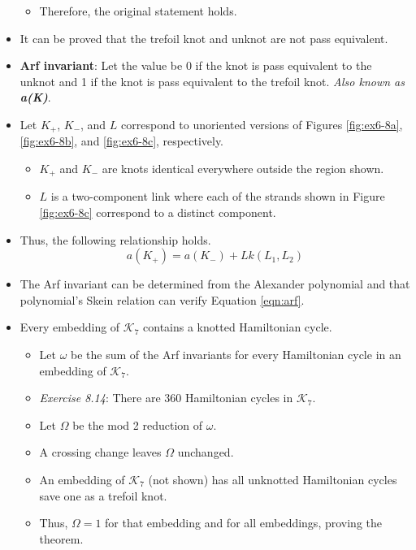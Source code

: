 \documentclass[titlepage]{article}
\numberwithin{figure}{section}
\numberwithin{table}{section}
\numberwithin{equation}{section}
\begin{document}
\begin{itemize}
\begin{itemize}
        \item Therefore, the original statement holds.
    \end{itemize}
    \item It can be proved that the trefoil knot and unknot are not pass equivalent.
    \item \textbf{Arf invariant}: Let the value be 0 if the knot is pass equivalent to the unknot and 1 if the knot is pass equivalent to the trefoil knot. \emph{Also known as} \emph{\textbf{a(K)}}.
    \item Let $K_+$, $K_-$, and $L$ correspond to unoriented versions of Figures \ref{fig:ex6-8a}, \ref{fig:ex6-8b}, and \ref{fig:ex6-8c}, respectively.
    \begin{itemize}
        \item $K_+$ and $K_-$ are knots identical everywhere outside the region shown.
        \item $L$ is a two-component link where each of the strands shown in Figure \ref{fig:ex6-8c} correspond to a distinct component.
    \end{itemize}
    \item Thus, the following relationship holds.
    \begin{equation}\label{eqn:arf}
        a(K_+) = a(K_-)+Lk(L_1,L_2)
    \end{equation}
    \item The Arf invariant can be determined from the Alexander polynomial and that polynomial's Skein relation can verify Equation \ref{eqn:arf}.
    \item Every embedding of $\mathcal{K}_7$ contains a knotted Hamiltonian cycle.
    \begin{itemize}
        \item Let $\omega$ be the sum of the Arf invariants for every Hamiltonian cycle in an embedding of $\mathcal{K}_7$.
        \item \emph{Exercise 8.14}: There are 360 Hamiltonian cycles in $\mathcal{K}_7$.
        \item Let $\Omega$ be the mod 2 reduction of $\omega$.
        \item A crossing change leaves $\Omega$ unchanged.
        \item An embedding of $\mathcal{K}_7$ (not shown) has all unknotted Hamiltonian cycles save one as a trefoil knot.
        \item Thus, $\Omega=1$ for that embedding and for all embeddings, proving the theorem.
    \end{itemize}

\end{itemize}
\end{document}
